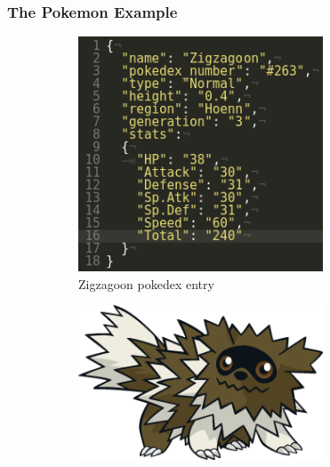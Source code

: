 \documentclass{beamer}
\begin{document}
\begin{frame}
  \frametitle{The Pokemon Example}
  \begin{figure}
  \centering  
  \begin{subfigure}{.8\textwidth}
      \centering  
      \includegraphics[width=0.8\textwidth]{Pokemon2.png}
    \caption{Zigzagoon pokedex entry}
  \end{subfigure}%
  \pause
  \begin{subfigure}{.2\textwidth}
    \centering  
    \includegraphics[width=0.8\textwidth]{Zigzagoon.png}
  \end{subfigure}
  \end{figure}
\end{frame}
\end{document}
